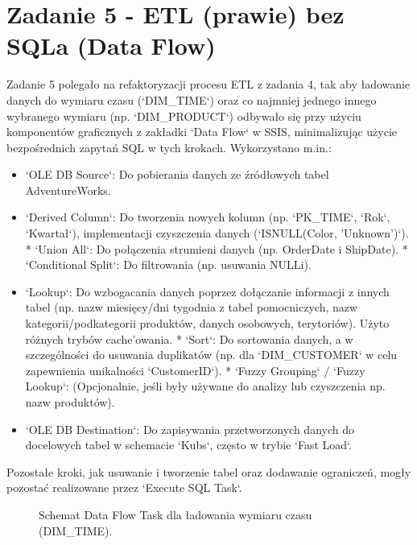 \documentclass[a4paper,12pt]{article}
\begin{document}
\section{Zadanie 5 - ETL (prawie) bez SQLa (Data Flow)}

Zadanie 5 polegało na refaktoryzacji procesu ETL z zadania 4, tak aby ładowanie danych do wymiaru czasu (`DIM\_TIME`) oraz co najmniej jednego innego wybranego wymiaru (np. `DIM\_PRODUCT`) odbywało się przy użyciu komponentów graficznych z zakładki `Data Flow` w SSIS, minimalizując użycie bezpośrednich zapytań SQL w tych krokach. Wykorzystano m.in.:
\begin{itemize}
    \item `OLE DB Source`: Do pobierania danych ze źródłowych tabel AdventureWorks.
    \item `Derived Column`: Do tworzenia nowych kolumn (np. `PK\_TIME`, `Rok`, `Kwartał`), implementacji czyszczenia danych (`ISNULL(Color, 'Unknown')`).
          *   `Union All`: Do połączenia strumieni danych (np. OrderDate i ShipDate).
          *   `Conditional Split`: Do filtrowania (np. usuwania NULLi).
    \item `Lookup`: Do wzbogacania danych poprzez dołączanie informacji z innych tabel (np. nazw miesięcy/dni tygodnia z tabel pomocniczych, nazw kategorii/podkategorii produktów, danych osobowych, terytoriów). Użyto różnych trybów cache'owania.
          *   `Sort`: Do sortowania danych, a w szczególności do usuwania duplikatów (np. dla `DIM\_CUSTOMER` w celu zapewnienia unikalności `CustomerID`).
          *   `Fuzzy Grouping` / `Fuzzy Lookup`: (Opcjonalnie, jeśli były używane do analizy lub czyszczenia np. nazw produktów).
    \item `OLE DB Destination`: Do zapisywania przetworzonych danych do docelowych tabel w schemacie `Kubs`, często w trybie `Fast Load`.
\end{itemize}
Pozostałe kroki, jak usuwanie i tworzenie tabel oraz dodawanie ograniczeń, mogły pozostać realizowane przez `Execute SQL Task`.

\begin{figure}[H]
    \centering
    \caption{Schemat Data Flow Task dla ładowania wymiaru czasu (DIM\_TIME).}
    \label{fig:zad5_dft_dim_time}
\end{figure}
\end{document}

